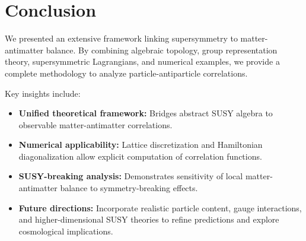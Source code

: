 \documentclass[12pt,a4paper]{article}
\begin{document}
\section{Conclusion}
We presented an extensive framework linking supersymmetry to matter-antimatter balance. By combining algebraic topology, group representation theory, supersymmetric Lagrangians, and numerical examples, we provide a complete methodology to analyze particle-antiparticle correlations.  

Key insights include:  
\begin{itemize}
    \item \textbf{Unified theoretical framework:} Bridges abstract SUSY algebra to observable matter-antimatter correlations.  
    \item \textbf{Numerical applicability:} Lattice discretization and Hamiltonian diagonalization allow explicit computation of correlation functions.  
    \item \textbf{SUSY-breaking analysis:} Demonstrates sensitivity of local matter-antimatter balance to symmetry-breaking effects.  
    \item \textbf{Future directions:} Incorporate realistic particle content, gauge interactions, and higher-dimensional SUSY theories to refine predictions and explore cosmological implications.
\end{itemize}
\end{document}

